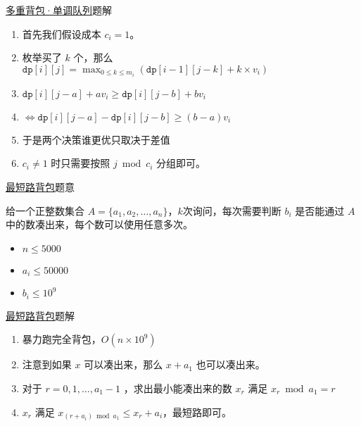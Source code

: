 \documentclass{beamer}
\begin{document}
\begin{frame}{\href{https://vjudge.net/problem/51Nod-1086}{多重背包·单调队列}}{题解}

\begin{enumerate}
    \item 首先我们假设成本 $c_i = 1$。
    \item 枚举买了 $k$ 个，那么 $\texttt{dp}[i][j] = \max_{0\le k\le m_i}( \texttt{dp}[i-1][j-k]+k\times v_i)$
    \item $\texttt{dp}[i][j-a]+av_i \ge \texttt{dp}[i][j-b]+bv_i$
    \item $\iff \texttt{dp}[i][j-a] - \texttt{dp}[i][j-b] \ge (b- a)v_i$
    \item 于是两个决策谁更优只取决于差值
    \item $c_i \ne 1$ 时只需要按照 $j \bmod c_i$ 分组即可。
\end{enumerate}




\end{frame}

\begin{frame}{\href{https://szkopul.edu.pl/problemset/problem/4CirgBfxbj9tIAS2C7DWCCd7/site/?key=statement}{最短路背包}}{题意}

给一个正整数集合 $A = \{a_1,a_2,\ldots,a_n\}$，$k$次询问，每次需要判断 $b_i$ 是否能通过 $A$ 中的数凑出来，每个数可以使用任意多次。

\begin{itemize}
    \item $ n \le 5000$
    \item $ a_i\le 50000$
    \item $ b_i \le 10^9$
\end{itemize}
\end{frame}


\begin{frame}{\href{https://szkopul.edu.pl/problemset/problem/4CirgBfxbj9tIAS2C7DWCCd7/site/?key=statement}{最短路背包}}{题解}

\begin{enumerate}
    \item 暴力跑完全背包，$O(n\times 10^9)$
    \item 注意到如果 $x$ 可以凑出来，那么 $x+a_1$ 也可以凑出来。
    \item 对于 $r = 0,1,\ldots,a_1-1$ ，求出最小能凑出来的数 $x_r$ 满足 $x_r \bmod a_1 = r$
    \item $x_r$ 满足 $x_{(r+a_i) \bmod a_1} \le x_r + a_i$，最短路即可。
\end{enumerate}
\end{frame}
\end{document}
